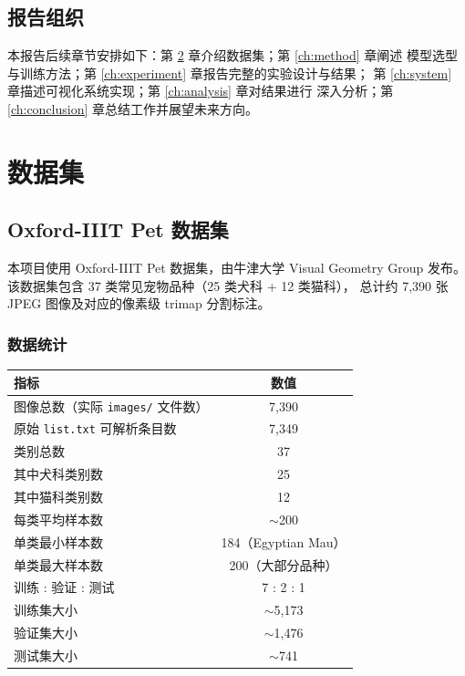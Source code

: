 \documentclass[12pt, a4paper, openany]{ctexbook}
\begin{document}
\section{报告组织}

本报告后续章节安排如下：第 \ref{ch:data} 章介绍数据集；第 \ref{ch:method} 章阐述
模型选型与训练方法；第 \ref{ch:experiment} 章报告完整的实验设计与结果；
第 \ref{ch:system} 章描述可视化系统实现；第 \ref{ch:analysis} 章对结果进行
深入分析；第 \ref{ch:conclusion} 章总结工作并展望未来方向。

\chapter{数据集}
\label{ch:data}

\section{Oxford-IIIT Pet 数据集}

本项目使用 Oxford-IIIT Pet 数据集\cite{parkhi2012cats}，由牛津大学
Visual Geometry Group 发布。该数据集包含 37 类常见宠物品种（25 类犬科 + 12 类猫科），
总计约 7{,}390 张 JPEG 图像及对应的像素级 trimap 分割标注。

\subsection{数据统计}

\begin{center}
\begin{tabular}{lc}
  \toprule
  \textbf{指标} & \textbf{数值} \\
  \midrule
  图像总数（实际 \texttt{images/} 文件数）& 7{,}390 \\
  原始 \texttt{list.txt} 可解析条目数 & 7{,}349 \\
  类别总数           & 37 \\
  其中犬科类别数     & 25 \\
  其中猫科类别数     & 12 \\
  每类平均样本数     & $\sim$200 \\
  单类最小样本数     & 184（Egyptian Mau）\\
  单类最大样本数     & 200（大部分品种）\\
  训练 : 验证 : 测试 & 7 : 2 : 1 \\
  训练集大小         & $\sim$5{,}173 \\
  验证集大小         & $\sim$1{,}476 \\
  测试集大小         & $\sim$741 \\
  \bottomrule
\end{tabular}
\end{center}
\end{document}
